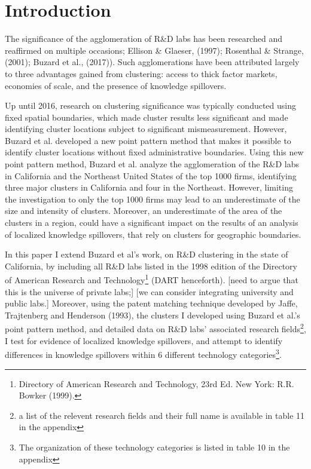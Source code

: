 \documentclass[12pt,letterpaper]{article}
\begin{document}
\section{Introduction}
The significance of the agglomeration of R\&D labs has been researched and reaffirmed on multiple occasions; %
Ellison \& Glaeser, (1997); Rosenthal \& Strange, (2001); Buzard et al., (2017)). Such agglomerations have been attributed largely to three advantages gained from clustering: access to thick factor markets, economies of scale, and the presence of knowledge spillovers. 
\par
Up until 2016, research on clustering significance was typically conducted using fixed spatial boundaries, which made cluster results less significant and made identifying cluster locations subject to significant mismeasurement. However, Buzard et al. developed a new point pattern method that makes it possible to identify cluster locations without fixed administrative boundaries. Using this new point pattern method, Buzard et al. analyze the agglomeration of the R\&D labs in California and the Northeast United States of the top 1000 firms, identifying three major clusters in California and four in the Northeast. However, limiting the investigation to only the top 1000 firms may lead to an underestimate of the size and intensity of clusters. Moreover, an underestimate of the area of the clusters in a region, could have a significant impact on the results of an analysis of localized knowledge spillovers, that rely on clusters for geographic boundaries. 
\par
In this paper I extend Buzard et al's work, on R\&D clustering in the state of California, by including all R\&D labs listed in the 1998 edition of the Directory of American Research and Technology\footnote{Directory of American Research and Technology, 23rd Ed. New York: R.R. Bowker (1999).} (DART henceforth). [{\color{red}need to argue that this is the universe of private labs;}] [{\color{blue}we can consider integrating university and public labs.}] Moreover, using the patent matching technique developed by Jaffe, Trajtenberg and Henderson (1993), the clusters I developed using Buzard et al.'s point pattern method, and detailed data on R\&D labs' associated research fields\footnote{a list of the relevent research fields and their full name is available in table 11 in the appendix}, I test for evidence of localized knowledge spillovers, and attempt to identify differences in knowledge spillovers within 6 different technology categories\footnote{The organization of these technology categories is listed in table 10 in the appendix}. 
\end{document}
